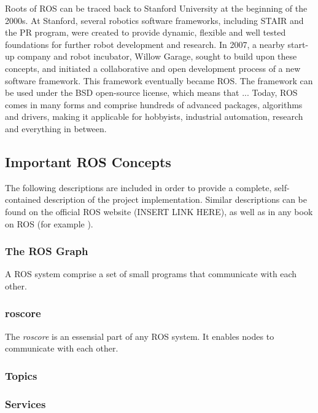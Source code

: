 Roots of \ac{ROS} can be traced back to Stanford University at the beginning of the 2000s. At Stanford, several robotics software frameworks, including \ac{STAIR} and the \ac{PR} program, were created to provide dynamic, flexible and well tested foundations for further robot development and research. In 2007, a nearby start-up company and robot incubator, Willow Garage, sought to build upon these concepts, and initiated a collaborative and open development process of a new software framework. This framework eventually became \ac{ROS}\cite{ROS_history}\cite{rosbook15}. The framework can be used under the BSD open-source license, which means that ...\cite{BCD_license} Today, \ac{ROS} comes in many forms and comprise hundreds of advanced packages, algorithms and drivers, making it applicable for hobbyists, industrial automation, research and everything in between. 

\subsection{Important ROS Concepts}

The following descriptions are included in order to provide a complete, self-contained description of the project implementation. Similar descriptions can be found on the official \ac{ROS} website (INSERT LINK HERE), as well as in any book on \ac{ROS} (for example \cite{rosbook15}). 

\subsubsection{The ROS Graph}

A \ac{ROS} system comprise a set of small programs that communicate with each other. 

\subsubsection{roscore}

The \textit{roscore} is an essensial part of any \ac{ROS} system. It enables nodes to communicate with each other.

\subsubsection{Topics}

\subsubsection{Services}


